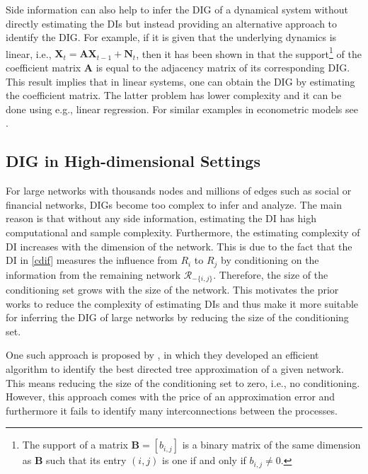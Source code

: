 Side information can also help to infer the DIG of a dynamical system without directly estimating the DIs but instead providing an alternative approach to identify the DIG. 
For example, if it is given that the underlying dynamics is linear, i.e., $\textbf{X}_t = \textbf{AX}_{t-1} + \textbf{N}_t$, then it has been shown in \citet{acc2014} that the support\footnote{The support of a matrix $\textbf{B}=[b_{i,j}]$ is a binary matrix of the same dimension as $\textbf{B}$ such that its entry $(i,j)$ is one if and only if $b_{i,j}\neq0$.} of the coefficient matrix $\textbf{A}$ is equal to the adjacency matrix of its corresponding DIG.   
This result implies that in linear systems, one can obtain the DIG by estimating the coefficient matrix. The latter problem has lower complexity and it can be done using e.g., linear regression. 
For similar examples in econometric models see \citet{etesami2018econometric}.

  





\subsection{DIG in High-dimensional Settings}
For large networks with thousands nodes and millions of edges such as social or financial networks, DIGs become too complex to infer and analyze.
The main reason is that without any side information, estimating the DI has high computational and sample complexity. 
Furthermore, the estimating complexity of DI increases with the dimension of the network.
This is due to the fact that the DI in \eqref{cdif} measures the influence from $R_i$ to $R_j$ by conditioning on the information from the remaining network $\mathcal{R}_{-\{i,j\}}$. 
Therefore, the size of the conditioning set grows with the size of the network.
This motivates the prior works to reduce the complexity of estimating  DIs and thus make it more suitable for inferring the DIG of large networks by reducing the size of the conditioning set. 


One such approach is proposed by \citet{quinn2013efficient}, in which they developed an efficient algorithm to identify the best directed tree approximation of a given network.
This means reducing the size of the conditioning set to zero, i.e., no conditioning.  
However, this approach comes with the price of an approximation error and furthermore it fails to identify many interconnections between the processes. 

